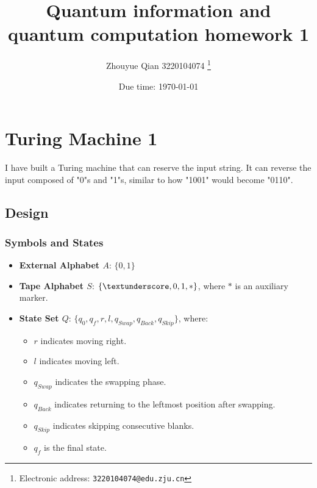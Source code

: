 \documentclass[a4paper]{article}
\begin{document}
\title{Quantum information and quantum computation homework 1}

\author{Zhouyue Qian 3220104074
  \thanks{Electronic address: \texttt{3220104074@edu.zju.cn}}}


\date{Due time: \today}

\maketitle






\section{Turing Machine 1}
I have built a Turing machine that can reserve the input string. It can reverse the input composed of "0"s and "1"s, similar to how "1001" would become "0110".
\subsection{\textbf{Design}}



\subsubsection{Symbols and States}

\begin{itemize}
    \item \textbf{External Alphabet \( A \)}: \(\{0, 1\}\)
    \item \textbf{Tape Alphabet \( S \)}: \(\{\textunderscore, 0, 1, *\}\), where \(*\) is an auxiliary marker.
    \item \textbf{State Set \( Q \)}: \(\{q_0, q_f, r, l, q_{Swap}, q_{Back}, q_{Skip}\}\), where:
    \begin{itemize}
        \item \( r \) indicates moving right.
        \item \( l \) indicates moving left.
        \item \( q_{Swap} \) indicates the swapping phase.
        \item \( q_{Back} \) indicates returning to the leftmost position after swapping.
        \item \( q_{Skip} \) indicates skipping consecutive blanks.
        \item \( q_f \) is the final state.
    \end{itemize}
\end{itemize}
\end{document}
